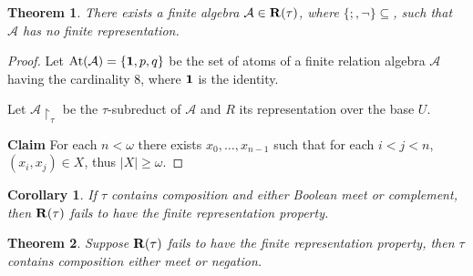 \documentclass[a4paper]{article}
\theoremstyle{defin}
\theoremstyle{theorem}
\newtheorem{theorem}{Theorem}
\theoremstyle{prop}
\theoremstyle{lemma}
\theoremstyle{ex}
\theoremstyle{col}
\newtheorem{col}{Corollary}
\theoremstyle{claim}
\begin{document}
\begin{theorem}
  There exists a finite algebra $\mathcal{A} \in {\bf R}(\tau)$, where $\{ ;, \neg \} \subseteq$, such that $\mathcal{A}$ has no finite representation.
\end{theorem}

\begin{proof}
  Let $\operatorname{At}(\mathcal{A}) = \{ {\bf 1}, p, q \}$ be the set of atoms of a finite relation algebra $\mathcal{A}$ having the cardinality $8$, where ${\bf 1}$ is the identity.

  Let $\mathcal{A} \upharpoonright_{\tau}$ be the $\tau$-subreduct of $\mathcal{A}$ and $R$ its representation over the base $U$.

  {\bf Claim} For each $n < \omega$ there exists $x_0, \dots, x_{n - 1}$ such that for each $i < j < n$, $(x_i, x_j) \in X$, thus $|X| \geq \omega$.
\end{proof}

\begin{col}
  If $\tau$ contains composition and either Boolean meet or complement, then ${\bf R}(\tau)$ fails to have the finite representation property.
\end{col}

\begin{theorem}
  Suppose ${\bf R}(\tau)$ fails to have the finite representation property, then $\tau$ contains composition either meet or negation.
\end{theorem}



\end{document}
